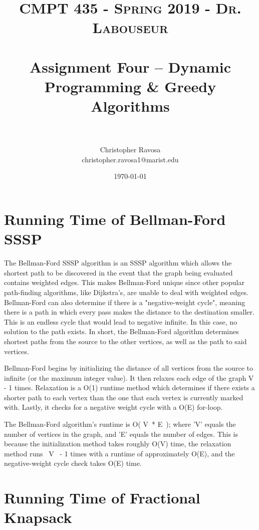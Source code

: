 \documentclass[letterpaper, 10pt]{article}
\title{	
   \normalfont \normalsize 
   \textsc{CMPT 435 - Spring 2019 - Dr. Labouseur} \\[10pt] %
   \horrule{0.5pt} \\[0.25cm] 	%
   \huge Assignment Four -- Dynamic Programming \& Greedy Algorithms \\   %
   \horrule{0.5pt} \\[0.25cm] 	%
}
\author{Christopher Ravosa \\ \normalsize christopher.ravosa1@marist.edu}
\date{\normalsize\today} %
\begin{document}
\maketitle %

\section{Running Time of Bellman-Ford SSSP}\par

The Bellman-Ford SSSP algorithm is an SSSP algorithm which allows the shortest path to be discovered in the event that the graph being evaluated contains weighted edges. This makes Bellman-Ford unique since other popular path-finding algorithms, like Dijkstra's, are unable to deal with weighted edges. Bellman-Ford can also determine if there is a "negative-weight cycle", meaning there is a path in which every pass makes the distance to the destination smaller. This is an endless cycle that would lead to negative infinite. In this case, no solution to the path exists. In short, the Bellman-Ford algorithm determines shortest paths from the source to the other vertices, as well as the path to said vertices.\par
Bellman-Ford begins by initializing the distance of all vertices from the source to infinite (or the maximum integer value). It then relaxes each edge of the graph \textbar V \textbar - 1 times. Relaxation is a O(1) runtime method which determines if there exists a shorter path to each vertex than the one that each vertex is currently marked with. Lastly, it checks for a negative weight cycle with a O(E) for-loop. \par
The Bellman-Ford algorithm's runtime is O( \textbar V\textbar \ * \textbar E\textbar \ ); where 'V' equals the number of vertices in the graph, and 'E' equals the number of edges. This is because the initialization method takes roughly O(V) time, the relaxation method runs \textbar \ V \textbar \ - 1 times with a runtime of approximately O(E), and the negative-weight cycle check takes O(E) time. \par


\section{Running Time of Fractional Knapsack}\par
\end{document}
